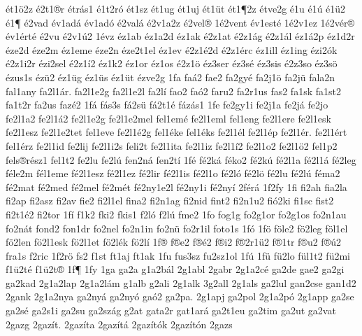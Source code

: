 {^^e9t1^^f62z
^^e92t1^^aer
^^e9tr^^e1s1
^^e91t2r^^f3
^^e9t1sz
^^e9t1ug
^^e9t1uj
^^e9t1^^fct
^^e9t1^^b62z
^^e9tve2g
^^e91u
^^e91^^fa
^^e91^^fc2
^^e91^^b6
^^e92vad
^^e9v1ad^^e1
^^e9v1ad^^f3
^^e92val^^e1
^^e92v1a2z
^^e92vel^^ae
1^^e92vent
^^e9v1est^^e9
1^^e92v1ez
1^^e92v^^e9r^^ae
^^e9v1^^e9rt^^e9
^^e92vu
^^e92v1^^fa2
1^^e9vz
^^e9z1ab
^^e9z1a2d
^^e9z1ak
^^e92z1at
^^e92z1^^e1g
^^e92z1^^e1l
^^e9z1^^e12p
^^e9z1d2r
^^e9ze2d
^^e9ze2m
^^e9z1eme
^^e9ze2n
^^e9ze2t1el
^^e9z1ev
^^e92z1^^e92d
^^e92z1^^e9rc
^^e9z1ill
^^e9z1ing
^^e9zi2^^f3k
^^e92z1i2r
^^e9zi2sel
^^e92z1^^ed2
^^e9z1k2
^^e9z1or
^^e9z1os
^^e92z1^^f6
^^e9z3ser
^^e9z3s^^e9
^^e9z3sis
^^e92z3so
^^e9z3s^^f6
^^e9zus1s
^^e9z^^fc2
^^e9z1^^fcg
^^e9z1^^fcs
^^e9z1^^fct
^^e9zve2g
1fa
fa^^e12
fae2
fa2gy^^e9
fa2j1^^f6
fa2j^^fc
fala2n
fal1any
fa2l1^^e1r.
fa2l1e2g
fa2l1e2l
fa2l^^ed
fao2
fa^^f32
faru2
fa2r1us
fas2
fa1sk
fa1st2
fa1t2r
fa2us
faz^^e92
1f^^e1
f^^e1s3s
f^^e12s^^fc
f^^e12t1^^e9
f^^e1z^^e1s1
1fe
fe2gy1i
fe2j1a
fe2j^^e1
fe2jo
fe2l1a2
fe2l1^^e12
fe2l1e2g
fe2l1e2mel
fel1em^^e9
fe2l1eml
fel1eng
fe2l1ere
fe2l1esk
fe2l1esz
fe2l1e2tet
fel1eve
fe2l1^^e92g
fel1^^e9ke
fel1^^e9ks
fe2l1^^e9l
fe2l1^^e9p
fe2l1^^e9r.
fe2l1^^e9rt
fel1^^e9rz
fe2l1id
fe2lij
fe2l1i2s
feli2t
fe2l1ita
fe2l1iz
fe2l1^^ed2
fe2l1o2
fe2l1^^f62
fel1p2
fels^^aer^^e9sz1
fel1t2
fe2lu
fe2l^^fa
fen2n^^e1
fen2t^^ed
1f^^e9
f^^e92k^^e1
f^^e9ko2
f^^e92k^^fa
f^^e92l1a
f^^e92l1^^e1
f^^e92leg
f^^e9le2m
f^^e9l1eme
f^^e92l1esz
f^^e92l1ez
f^^e92lir
f^^e92l1is
f^^e92l1o
f^^e92l^^f3
f^^e92l^^f6
f^^e92lu
f^^e92l^^fa
f^^e9ma2
f^^e92mat
f^^e92med
f^^e92mel
f^^e92m^^e9t
f^^e92ny1e2l
f^^e92ny1i
f^^e92ny^^ed
2f^^e9r^^e1
1f2fy
1fi
fi2ah
fia2la
fi2ap
fi2asz
fi2av
fie2
fi2l1el
fina2
fi2n1ag
fi2nid
fint2
fi2n1u2
fi^^f32ki
fi1sc
fist2
fi2t1^^e92
fi2tor
1f^^ed
f1k2
fki2
fkis1
f2l^^f3
f2l^^fa
fme2
1fo
fog1g
fo2g1or
fo2g1os
fo2n1au
fo2n^^e1t
fond2
fon1dr
fo2nel
fo2n1in
fo2n^^fc
fo2r1il
foto1s
1f^^f3
1f^^f6
f^^f6le2
f^^f62leg
f^^f6l1el
f^^f62len
f^^f62l1esk
f^^f62l1et
f^^f62l^^e9k
f^^f62l^^ed
1f^^ae
f^^aee2
f^^ae^^e92
f^^aei2
f^^ae2r1^^fc2
f^^ae1tr
f^^aeu2
f^^ae^^fa2
fra1s
f2ric
1f2r^^f6
fs2
f1st
ft1aj
ft1ak
1fu
fus3sz
fu2sz1ol
1f^^fa
1f^^fc
f^^fc2lo
f^^fcl1t2
f^^fc2mi
f1^^fc2t^^e9
f1^^fc2t^^ae
1f^^b6
1fy
1ga
ga2a
g1a2b^^e1l
2g1abl
2gabr
2g1a2c^^e9
ga2de
gae2
ga2gi
ga2kad
2g1a2lap
2g1a2l^^e1m
g1alb
g2ali
2g1alk
3g2all
2g1als
ga2lul
gan2cse
gan1d2
2gank
2g1a2nya
ga2ny^^e1
ga2ny^^f3
ga^^f32
ga2pa.
2g1apj
ga2pol
2g1a2p^^f3
2g1app
ga2se
ga2s^^e9
ga2s1i
ga2su
ga2sz^^e1g
g2at
gata2r
gat1ar^^e1
ga2t1eu
ga2tim
ga2ut
ga2vat
2gazg
2gaz^^edt.
2gaz^^edta
2gaz^^edt^^e1
2gaz^^edt^^f3k
2gaz^^edt^^f3n
2gazs
}
